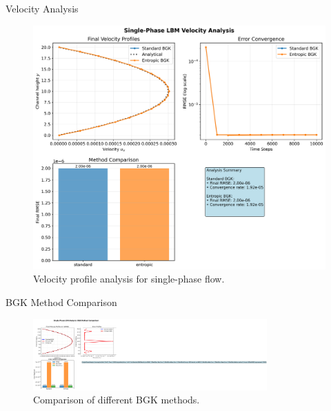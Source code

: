 \documentclass{beamer}
\begin{document}
\begin{frame}{Velocity Analysis}
  \begin{figure}
    \includegraphics[width=\textwidth]{plots/velocity_analysis.png}
    \caption{Velocity profile analysis for single-phase flow.}
  \end{figure}
\end{frame}

\begin{frame}{BGK Method Comparison}
  \begin{figure}
    \includegraphics[width=0.8\textwidth]{plots/single_phase/bgk_method_comparison.png}
    \caption{Comparison of different BGK methods.}
  \end{figure}
\end{frame}
\end{document}
